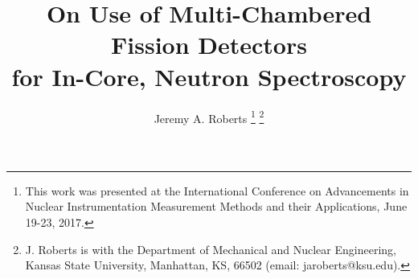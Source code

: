 \documentclass[journal]{IEEEtran}
\begin{document}
%
\title{On Use of Multi-Chambered Fission Detectors \\for In-Core, Neutron Spectroscopy}

\author{Jeremy A. Roberts%
\thanks{This work was presented at the International Conference on Advancements in Nuclear Instrumentation Measurement Methods and their Applications, June 19-23, 2017.}
\thanks{J. Roberts is with the Department
of Mechanical and Nuclear Engineering, Kansas State University, Manhattan,
KS, 66502 (email: jaroberts@ksu.edu).}
}

% 
%



% 
\end{document}
